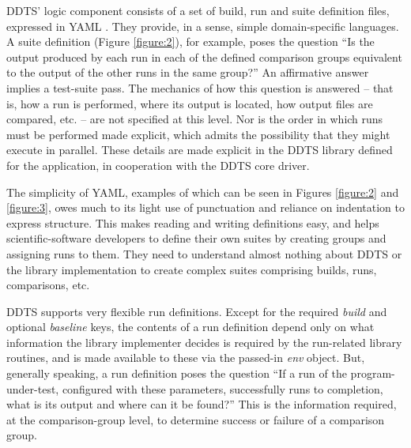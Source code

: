 \documentclass[conference]{IEEEtran}
\begin{document}
DDTS' logic component consists of a set of build, run and suite definition files, expressed in YAML \cite{yaml}. They provide, in a sense, simple domain-specific languages. A suite definition (Figure \ref{figure:2}), for example, poses the question ``Is the output produced by each run in each of the defined comparison groups equivalent to the output of the other runs in the same group?'' An affirmative answer implies a test-suite pass. The mechanics of how this question is answered -- that is, how a run is performed, where its output is located, how output files are compared, etc. -- are not specified at this level. Nor is the order in which runs must be performed made explicit, which admits the possibility that they might execute in parallel. These details are made explicit in the DDTS library defined for the application, in cooperation with the DDTS core driver.

The simplicity of YAML, examples of which can be seen in Figures \ref{figure:2} and \ref{figure:3}, owes much to its light use of punctuation and reliance on indentation to express structure. This makes reading and writing definitions easy, and helps scientific-software developers to define their own suites by creating groups and assigning runs to them. They need to understand almost nothing about DDTS or the library implementation to create complex suites comprising builds, runs, comparisons, etc.

DDTS supports very flexible run definitions. Except for the required \emph{build} and optional \emph{baseline} keys, the contents of a run definition depend only on what information the library implementer decides is required by the run-related library routines, and is made available to these via the passed-in \emph{env} object. But, generally speaking, a run definition poses the question ``If a run of the program-under-test, configured with these parameters, successfully runs to completion, what is its output and where can it be found?'' This is the information required, at the comparison-group level, to determine success or failure of a comparison group.
\end{document}
